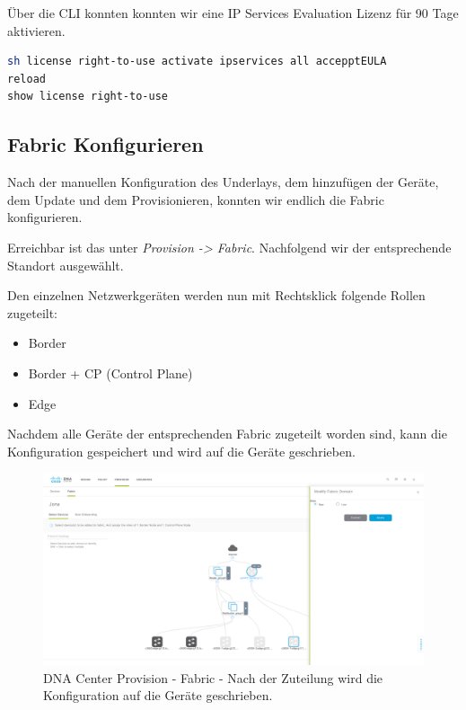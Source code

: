 Über die CLI konnten konnten wir eine IP Services Evaluation Lizenz für 90 Tage aktivieren.

\begin{lstlisting}[language=bash]
sh license right-to-use activate ipservices all accepptEULA
reload
show license right-to-use
\end{lstlisting}

\subsection{Fabric Konfigurieren}
Nach der manuellen Konfiguration des Underlays, dem hinzufügen der Geräte, dem Update und dem Provisionieren, konnten wir endlich die Fabric konfigurieren. 

Erreichbar ist das unter \textit{Provision -> Fabric}. Nachfolgend wir der entsprechende Standort ausgewählt.

Den einzelnen Netzwerkgeräten werden nun mit Rechtsklick folgende Rollen zugeteilt:
\begin{itemize}
	\item Border
	\item Border + CP (Control Plane)
	\item Edge
\end{itemize}

Nachdem alle Geräte der entsprechenden Fabric zugeteilt worden sind, kann die Konfiguration gespeichert und wird auf die Geräte geschrieben. 

\begin{figure}[H]
	\centering
	\includegraphics[width=16cm]{img/dna-center-fabric-1.png}
	\caption{DNA Center Provision - Fabric - Nach der Zuteilung wird die Konfiguration auf die Geräte geschrieben.}
	\label{fig:IP Base and Services}
\end{figure}


